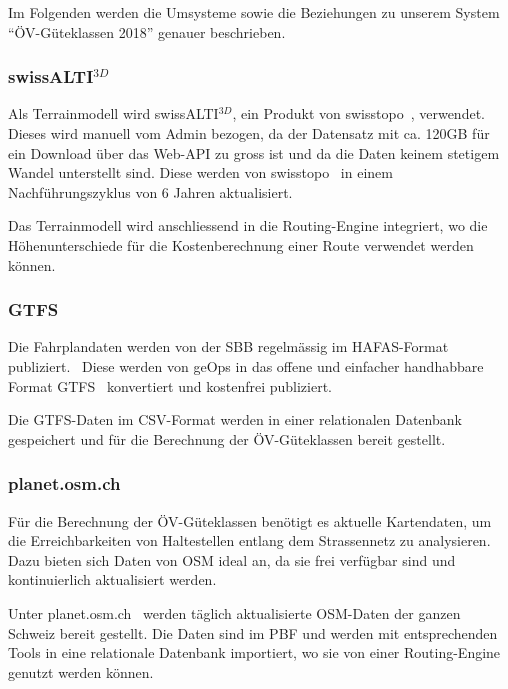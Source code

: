 Im Folgenden werden die Umsysteme sowie die Beziehungen zu unserem System "`ÖV-Güteklassen 2018"' genauer beschrieben.

\subsubsection{swissALTI$^{3D}$}
\label{subsystem:swissALTI3D}

Als \gls{Terrainmodell} wird swissALTI$^{3D}$, ein Produkt von swisstopo~\cite{swissalti3d_swisstopo}, verwendet.
Dieses wird manuell vom Admin bezogen, da der Datensatz mit ca. 120GB für ein Download über das Web-\ac{API} zu gross ist und da die Daten keinem stetigem Wandel unterstellt sind.
Diese werden von swisstopo~\cite{swissalti3d_swisstopo} in einem Nachführungszyklus von 6 Jahren aktualisiert.

Das \gls{Terrainmodell} wird anschliessend in die Routing-Engine integriert, wo die Höhenunterschiede für die Kostenberechnung einer Route verwendet werden können.

\subsubsection{GTFS}
\label{subsystem:GTFS}

Die Fahrplandaten werden von der SBB regelmässig im HAFAS-Format publiziert.~\cite{sbb_hafas_spec}
Diese werden von geOps in das offene und einfacher handhabbare Format \ac{GTFS}~\cite{gtfs_spec} konvertiert und kostenfrei publiziert.~\cite{geops_fahrplandaten}

Die \ac{GTFS}-Daten im CSV-Format werden in einer relationalen Datenbank gespeichert und für die Berechnung der ÖV-Güteklassen bereit gestellt.

\subsubsection{planet.osm.ch}
\label{subsystem:planet.osm.ch}

Für die Berechnung der ÖV-Güteklassen benötigt es aktuelle Kartendaten, um die Erreichbarkeiten von Haltestellen entlang dem Strassennetz zu analysieren.
Dazu bieten sich Daten von \ac{OSM} ideal an, da sie frei verfügbar sind und kontinuierlich aktualisiert werden.

Unter planet.osm.ch~\cite{planet_osm_ch} werden täglich aktualisierte \ac{OSM}-Daten der ganzen Schweiz bereit gestellt.
Die Daten sind im \ac{PBF} und werden mit entsprechenden Tools in eine relationale Datenbank importiert, wo sie von einer Routing-Engine genutzt werden können.


